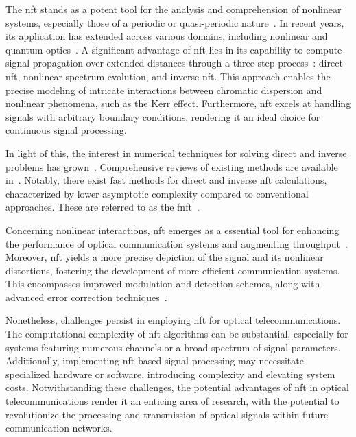 The \acrfull{nft} stands as a potent tool for the analysis and comprehension of nonlinear systems, especially those of a periodic or quasi-periodic nature~\cite{zakharov1972exact, Ablowitz1981, Kamalian2018}. In recent years, its application has extended across various domains, including nonlinear and quantum optics~\cite{Gelash2019PRL, Mullyadzhanov2019, Chekhovskoy2019_PRL}.
A significant advantage of \acrshort{nft} lies in its capability to compute signal propagation over extended distances through a three-step process~\cite{Yousefi2014I}: direct \acrshort{nft}, nonlinear spectrum evolution, and inverse \acrshort{nft}. This approach enables the precise modeling of intricate interactions between chromatic dispersion and nonlinear phenomena, such as the Kerr effect. Furthermore, \acrshort{nft} excels at handling signals with arbitrary boundary conditions, rendering it an ideal choice for continuous signal processing.

In light of this, the interest in numerical techniques for solving direct and inverse problems has grown~\cite{Boffetta1992a, Belai2006, Frumin2015_TIB, 10026447}. Comprehensive reviews of existing methods are available in~\cite{Yousefi2014II, turitsyn2017nonlinear, Vasylchenkova2019a}. Notably, there exist fast methods for direct and inverse \acrshort{nft} calculations, characterized by lower asymptotic complexity compared to conventional approaches. These are referred to as the \acrfull{fnft}~\cite{Wahls2013, Wahls2015, Wahls2015a, Wahls2016, Vaibhav2018, Wahls2018, Chimmalgi2019}.

Concerning nonlinear interactions, \acrshort{nft} emerges as a essential tool for enhancing the performance of optical communication systems and augmenting throughput~\cite{Kamalian2018, turitsyn2017nonlinear, Le2014, Prilepsky2014, essiambre2012capacity, Civelli2019, sedov2018}. Moreover, \acrshort{nft} yields a more precise depiction of the signal and its nonlinear distortions, fostering the development of more efficient communication systems. This encompasses improved modulation and detection schemes, along with advanced error correction techniques~\cite{Frumin2017, Gui2017a, Aref2018_JLT}.

Nonetheless, challenges persist in employing \acrshort{nft} for optical telecommunications. The computational complexity of \acrshort{nft} algorithms can be substantial, especially for systems featuring numerous channels or a broad spectrum of signal parameters. Additionally, implementing \acrshort{nft}-based signal processing may necessitate specialized hardware or software, introducing complexity and elevating system costs.
Notwithstanding these challenges, the potential advantages of \acrshort{nft} in optical telecommunications render it an enticing area of research, with the potential to revolutionize the processing and transmission of optical signals within future communication networks.

